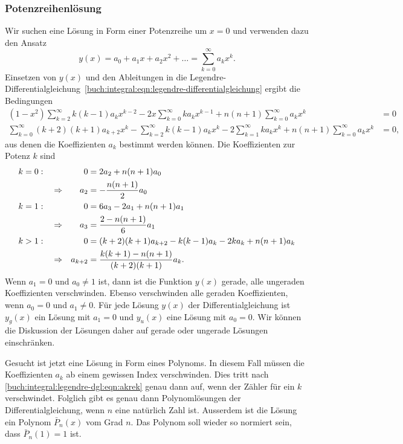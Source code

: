%
%
\subsubsection{Potenzreihenlösung}
Wir suchen eine Lösung in Form einer Potenzreihe um $x=0$ und 
verwenden dazu den Ansatz
\[
y(x) = a_0+a_1x+a_2x^2+ \dots = \sum_{k=0}^\infty a_kx^k.
\]
Einsetzen von $y(x)$ und den Ableitungen in die
Legendre-Differentialgleichung~\eqref{buch:integral:eqn:legendre-differentialgleichung}
ergibt die Bedingungen
\begin{align*}
(1-x^2) \sum_{k=2}^\infty k(k-1)a_kx^{k-2}
-2x\sum_{k=0}^\infty ka_kx^{k-1}
+
n(n+1)\sum_{k=0}^\infty  a_kx^k
&=
0
\\
\sum_{k=0}^\infty (k+2)(k+1)a_{k+2}x^k
-
\sum_{k=2}^\infty k(k-1)a_kx^k
-
2\sum_{k=1}^\infty ka_kx^k
+
n(n+1)\sum_{k=0}^\infty  a_kx^k
&=
0,
\end{align*}
aus denen die Koeffizienten $a_k$ bestimmt werden können.
Die Koeffizienten zur Potenz $k$ sind 
\begin{align}
k&=0:
&
&&
0&=
2a_2+n(n+1)a_0
\notag
\\
&&
&\Rightarrow&
a_2&=-\frac{n(n+1)}{2}a_0
\notag
\\
k&=1:
&
&&
0&=
6a_3-2a_1+n(n+1)a_1
\notag
\\
&&
&\Rightarrow&
a_3&= \frac{2-n(n+1)}{6}a_1
\notag
\\
k&>1:
&
&&
0&=
(k+2)(k+1)a_{k+2} -k(k-1)a_k -2ka_k +n(n+1) a_k
\notag
\\
&&
&\Rightarrow&
a_{k+2}
&=
\frac{ k(k+1)-n(n+1) }{(k+2)(k+1)}
a_k.
\label{buch:integral:legendre-dgl:eqn:akrek}
\end{align}
Wenn $a_1=0$ und $a_0\ne 1$ ist, dann ist die Funktion $y(x)$ gerade,
alle ungeraden Koeffizienten verschwinden.
Ebenso verschwinden alle geraden Koeffizienten, wenn $a_0=0$ und $a_1\ne 0$.
Für jede Lösung $y(x)$ der Differentialgleichung ist
$y_g(x)$ ein Lösung mit $a_1=0$ und $y_u(x)$ eine Lösung mit $a_0=0$.
Wir können die Diskussion der Lösungen daher auf gerade oder ungerade
Lösungen einschränken.

Gesucht ist jetzt eine Lösung in Form eines Polynoms.
In diesem Fall müssen die Koeffizienten $a_k$ ab einem
gewissen Index verschwinden.
Dies tritt nach \eqref{buch:integral:legendre-dgl:eqn:akrek} genau
dann auf, wenn der Zähler für ein $k$ verschwindet.
Folglich gibt es genau dann Polynomlösungen der Differentialgleichung,
wenn $n$ eine natürlich Zahl ist.
Ausserdem ist die Lösung ein Polynom $\bar{P}_n(x)$ vom Grad $n$.
Das Polynom soll wieder so normiert sein, dass $\bar{P}_n(1)=1$ ist.

